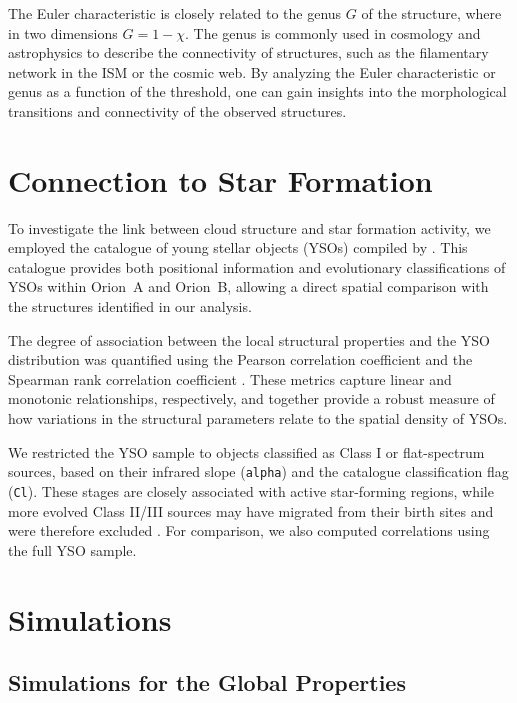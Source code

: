The Euler characteristic is closely related to the genus $G$ of the structure, where in two dimensions $G = 1 - \chi$. The genus is commonly used in cosmology and astrophysics to describe the connectivity of structures, such as the filamentary network in the ISM or the cosmic web. By analyzing the Euler characteristic or genus as a function of the threshold, one can gain insights into the morphological transitions and connectivity of the observed structures.

\section{Connection to Star Formation}

To investigate the link between cloud structure and star formation activity, we employed the catalogue of young stellar objects (YSOs) compiled by \cite{megeath2012catalogue}.  
This catalogue provides both positional information and evolutionary classifications of YSOs within Orion~A and Orion~B, allowing a direct spatial comparison with the structures identified in our analysis.

The degree of association between the local structural properties and the YSO distribution was quantified using the Pearson correlation coefficient \cite{pearson1895vii} and the Spearman rank correlation coefficient \cite{sedgwick2014spearman}.  
These metrics capture linear and monotonic relationships, respectively, and together provide a robust measure of how variations in the structural parameters relate to the spatial density of YSOs.

We restricted the YSO sample to objects classified as Class I or flat-spectrum sources, based on their infrared slope (\texttt{alpha}) and the catalogue classification flag (\texttt{Cl}). These stages are closely associated with active star-forming regions, while more evolved Class II/III sources may have migrated from their birth sites and were therefore excluded \cite{lada1987star}. For comparison, we also computed correlations using the full YSO sample.

\section{Simulations}

\subsection{Simulations for the Global Properties}

